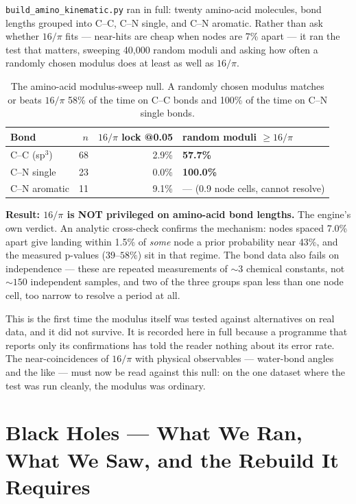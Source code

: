 \documentclass[11pt, letterpaper, openany]{book}
\begin{document}
\texttt{build\_amino\_kinematic.py} ran in full: twenty amino-acid molecules, bond lengths grouped
into C--C, C--N single, and C--N aromatic. Rather than ask whether $16/\pi$ fits --- near-hits are
cheap when nodes are 7\% apart --- it ran the test that matters, sweeping 40{,}000 random moduli and
asking how often a randomly chosen modulus does at least as well as $16/\pi$.

\begin{table}[H]
\centering
\small
\begin{tabular}{@{}lrrl@{}}
\toprule
\textbf{Bond} & \textbf{$n$} & \textbf{$16/\pi$ lock @0.05} & \textbf{random moduli $\geq 16/\pi$} \\
\midrule
C--C (sp$^3$) & 68 & 2.9\% & \textbf{57.7\%} \\
C--N single & 23 & 0.0\% & \textbf{100.0\%} \\
C--N aromatic & 11 & 9.1\% & --- (0.9 node cells, cannot resolve) \\
\bottomrule
\end{tabular}
\caption{The amino-acid modulus-sweep null. A randomly chosen modulus matches or beats $16/\pi$ 58\%
of the time on C--C bonds and 100\% of the time on C--N single bonds.}
\end{table}

\begin{signalbox}
\textbf{Result: $16/\pi$ is NOT privileged on amino-acid bond lengths.} The engine's own verdict.
An analytic cross-check confirms the mechanism: nodes spaced 7.0\% apart give landing within 1.5\%
of \emph{some} node a prior probability near 43\%, and the measured p-values ($39$--$58\%$) sit in
that regime. The bond data also fails on independence --- these are repeated measurements of $\sim3$
chemical constants, not $\sim150$ independent samples, and two of the three groups span less than one
node cell, too narrow to resolve a period at all.
\end{signalbox}

This is the first time the modulus itself was tested against alternatives on real data, and it did
not survive. It is recorded here in full because a programme that reports only its confirmations has
told the reader nothing about its error rate. The near-coincidences of $16/\pi$ with physical
observables --- water-bond angles and the like --- must now be read against this null: on the one
dataset where the test was run cleanly, the modulus was ordinary.

\section{Black Holes --- What We Ran, What We Saw, and the Rebuild It Requires}
\end{document}
